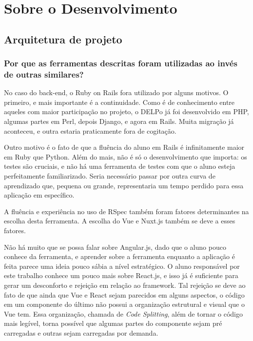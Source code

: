 
\chapter{Sobre o Desenvolvimento}
\label{cap:development}
\minitoc


\section{Arquitetura de projeto}\label{sec:arquitetura}

\subsection{Por que as ferramentas descritas foram utilizadas ao invés de outras similares?}
\label{subsec:ferramentas}

No caso do back-end, o Ruby on Rails fora utilizado por alguns motivos. O primeiro, e mais importante é a
continuidade. Como é de conhecimento entre aqueles com maior participação no projeto, o DELPo já foi
desenvolvido em PHP, algumas partes em Perl, depois Django, e agora em Rails. Muita migração já aconteceu,
e outra estaria praticamente fora de cogitação.

Outro motivo é o fato de que a fluência do aluno em Rails é infinitamente maior em Ruby que Python. Além do
mais, não é só o desenvolvimento que importa: os testes são cruciais, e não há uma ferramenta de testes com
que o aluno esteja perfeitamente familiarizado. Seria necessário passar por outra curva de aprendizado que,
pequena ou grande, representaria um tempo perdido para essa aplicação em específico.

A fluência e experiência no uso de RSpec também foram fatores determinantes na escolha desta ferramenta. A
escolha do Vue e Nuxt.js também se deve a esses fatores.

Não há muito que se possa falar sobre Angular.js, dado que o aluno pouco conhece da ferramenta, e aprender
sobre a ferramenta enquanto a aplicação é feita parece uma ideia pouco sábia a nível estratégico.
O aluno responsável por este trabalho conhece um pouco mais sobre React.js, e isso já é suficiente para gerar
um desconforto e rejeição em relação ao framework.
Tal rejeição se deve ao fato de que ainda que Vue e React sejam parecidos em alguns aspectos, o código em um
componente do último não possui a organização estrutural e visual que o Vue tem.
Essa organização, chamada de \emph{Code Splitting}, além de tornar o código mais legível, torna possível que
algumas partes do componente sejam pré carregadas e outras sejam carregadas por demanda.

